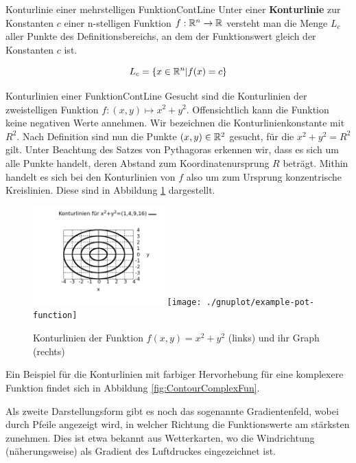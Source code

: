 \begin{definition}{Konturlinie einer mehrstelligen Funktion}{ContLine}
    Unter einer \textbf{Konturlinie} zur Konstanten $c$ einer n-stelligen Funktion $f: \mathbb{R}^n\to\mathbb{R}$ versteht man die Menge $L_c$ aller Punkte des Definitionsbereichs, an dem der Funktionswert gleich der Konstanten $c$ ist.

    $$
       L_c = \lbrace x \in \mathbb{R}^n | f(x) = c \rbrace
    $$
\end{definition}

\begin{example}{Konturlinien einer Funktion}{ContLine}
    Gesucht sind die Konturlinien der zweistelligen Funktion $f: (x,y) \mapsto x^2+y^2$. Offensichtlich kann die Funktion keine negativen Werte annehmen. Wir bezeichnen die Konturlinienkonstante mit $R^2$. Nach Definition sind nun die Punkte $(x,y)\in\mathbb{R}^2$ gesucht, für die $x^2+y^2=R^2$ gilt. Unter Beachtung des Satzes von Pythagoras erkennen wir, dass es sich um alle Punkte handelt, deren Abstand zum Koordinatenursprung $R$ beträgt. Mithin handelt es sich bei den Konturlinien von $f$ also um zum Ursprung konzentrische Kreislinien. Diese sind in Abbildung \ref{fig:ExContLine} dargestellt.
\end{example}

\begin{figure}
    \centering
    \includegraphics[width=0.45\textwidth]{./gnuplot/example-contour-plot}
    \texttt{[image: ./gnuplot/example-pot-function]}
    \caption[Konturlinien einer zweistelligen Funktion]{Konturlinien der Funktion $f(x,y)=x^2+y^2$ (links) und ihr Graph (rechts)}
    \label{fig:ExContLine}
\end{figure}

Ein Beispiel für die Konturlinien mit farbiger Hervorhebung für eine komplexere Funktion findet sich in Abbildung \ref{fig:ContourComplexFun}.

Als zweite Darstellungsform gibt es noch das sogenannte Gradientenfeld, wobei durch Pfeile angezeigt wird, in welcher Richtung die Funktionswerte am stärksten zunehmen. Dies ist etwa bekannt aus Wetterkarten, wo die Windrichtung (näherungsweise) als Gradient des Luftdruckes eingezeichnet ist.

